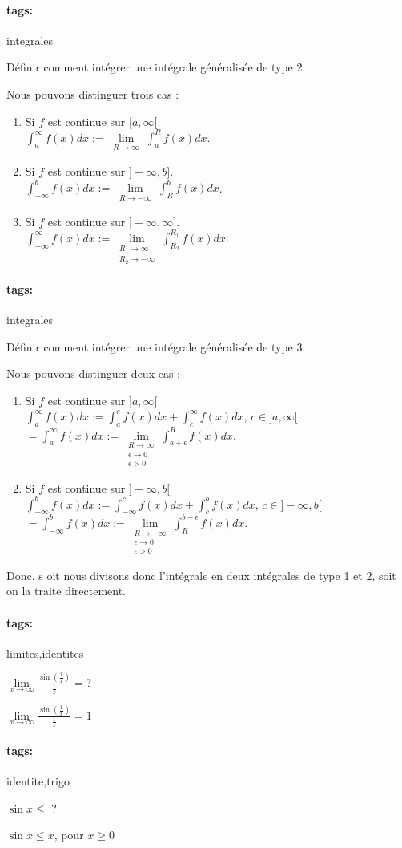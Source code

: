 \documentclass[12pt]{article}
\newcommand*{\xfield}[1]{\begin{mdframed}\centering #1\end{mdframed}\bigskip}
\newenvironment{note}{}{}
\newcommand*{\tags}[1]{\paragraph{tags: }#1}
\begin{document}
\begin{note}
	\tags{integrales}
	\xfield{Définir comment intégrer une intégrale généralisée de type 2.}
	\xfield{Nous pouvons distinguer trois cas :\begin{enumerate}
		\item Si $f$ est continue sur $[a,\infty[$.\\
		$\int_{a}^{\infty} f(x)dx := \lim\limits_{\substack{R \to \infty}} \int_{a}^{R}f(x)dx$.
		\item Si $f$ est continue sur $]-\infty,b]$.\\
		$\int_{-\infty}^{b} f(x)dx := \lim\limits_{\substack{R \to -\infty}} \int_{R}^{b}f(x)dx$.
		\item Si $f$ est continue sur $]-\infty,\infty]$.\\
		$\int_{-\infty}^{\infty} f(x)dx := \lim\limits_{\substack{R_1 \to \infty \\ R_2 \to -\infty}} \int_{R_2}^{R_1}f(x)dx$.
	\end{enumerate} }
\end{note}

\begin{note}
	\tags{integrales}
	\xfield{Définir comment intégrer une intégrale généralisée de type 3.}
	\xfield{Nous pouvons distinguer deux cas :\begin{enumerate}
		\item Si $f$ est continue sur $]a,\infty[$ \\
			$\int_{a}^{\infty} f(x)dx := \int_{a}^{c} f(x)dx + \int_{c}^{\infty}f(x)dx$, $c \in ]a,\infty[$\\
			$= \int_{a}^{\infty} f(x)dx := \lim\limits_{\substack{R \to \infty \\ \epsilon \to 0 \\ \epsilon > 0}} \int_{a+\epsilon}^{R}f(x)dx$.\\
		\item Si $f$ est continue sur $]-\infty,b[$ \\
			$\int_{-\infty}^{b} f(x)dx := \int_{-\infty}^{c} f(x)dx + \int_{c}^{b}f(x)dx$, $c \in ]-\infty,b[$\\
			$= \int_{-\infty}^{b} f(x)dx := \lim\limits_{\substack{R \to -\infty \\ \epsilon \to 0 \\ \epsilon > 0}} \int_{R}^{b-\epsilon}f(x)dx$.\\
	\end{enumerate}
	Donc, s oit nous divisons donc l'intégrale en deux intégrales de type 1 et 2, soit on la traite directement.}
\end{note}
\begin{note}
	\tags{limites,identites}
	\xfield{$\lim\limits_{x \to \infty}\frac{\sin(\frac{1}{x})}{\frac{1}{x}} = ?$}
	\xfield{$\lim\limits_{x \to \infty}\frac{\sin(\frac{1}{x})}{\frac{1}{x}} = 1$}
\end{note}

\begin{note}
	\tags{identite,trigo}
	\xfield{$\sin x \le$ ?}
	\xfield{$\sin x \le x$, pour $x \ge 0$}
\end{note}
\end{document}
